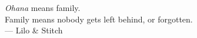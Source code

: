 \thispagestyle{empty}
{}

\vspace*{3cm}

\begin{center}
    \emph{Ohana} means family. \\
    Family means nobody gets left behind, or forgotten. \\ \medskip
    --- Lilo \& Stitch
\end{center}


